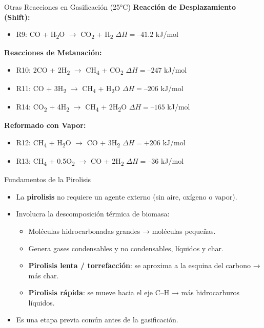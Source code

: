\documentclass[../../main.tex]{subfiles}
\begin{document}
\begin{frame}{Otras Reacciones en Gasificación (25°C)}
\scriptsize
\textbf{Reacción de Desplazamiento (Shift):}
\begin{itemize}
  \item R9: CO + H\textsubscript{2}O $\rightarrow$ CO\textsubscript{2} + H\textsubscript{2} \hfill $\Delta H = –41.2$ kJ/mol
\end{itemize}

\vspace{0.5em}
\textbf{Reacciones de Metanación:}
\begin{itemize}
  \item R10: 2CO + 2H\textsubscript{2} $\rightarrow$ CH\textsubscript{4} + CO\textsubscript{2} \hfill $\Delta H = –247$ kJ/mol
  \item R11: CO + 3H\textsubscript{2} $\rightarrow$ CH\textsubscript{4} + H\textsubscript{2}O \hfill $\Delta H = –206$ kJ/mol
  \item R14: CO\textsubscript{2} + 4H\textsubscript{2} $\rightarrow$ CH\textsubscript{4} + 2H\textsubscript{2}O \hfill $\Delta H = –165$ kJ/mol
\end{itemize}

\vspace{0.5em}
\textbf{Reformado con Vapor:}
\begin{itemize}
  \item R12: CH\textsubscript{4} + H\textsubscript{2}O $\rightarrow$ CO + 3H\textsubscript{2} \hfill $\Delta H = +206$ kJ/mol
  \item R13: CH\textsubscript{4} + 0.5O\textsubscript{2} $\rightarrow$ CO + 2H\textsubscript{2} \hfill $\Delta H = –36$ kJ/mol
\end{itemize}
\end{frame}

\begin{frame}{Fundamentos de la Pirolisis}
\small
\begin{itemize}
  \item La \textbf{pirolisis} no requiere un agente externo (sin aire, oxígeno o vapor).
  \item Involucra la descomposición térmica de biomasa:
  \begin{itemize}
    \item Moléculas hidrocarbonadas grandes → moléculas pequeñas.
    \item Genera gases condensables y no condensables, líquidos y char.
     \item \textbf{Pirolisis lenta / torrefacción}: se aproxima a la esquina del carbono → más char.
    \item \textbf{Pirolisis rápida}: se mueve hacia el eje C–H → más hidrocarburos líquidos.
  \end{itemize}
  \item Es una etapa previa común antes de la gasificación.
\end{itemize}
\end{frame}
\end{document}
